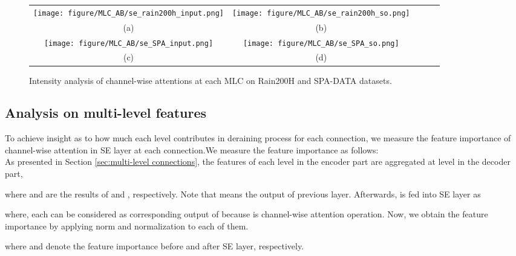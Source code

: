 \documentclass[a4paper,fleqn]{cas-dc}
\begin{document}
\begin{figure*}[!h]\footnotesize
	\centering
	\setlength{\tabcolsep}{0pt}
	
	\begin{tabular}{cclcclccl}
		\multicolumn{3}{c}{\texttt{[image: figure/MLC\_AB/se\_rain200h\_input.png]}} &
		\multicolumn{3}{c}{\texttt{[image: figure/MLC\_AB/se\_rain200h\_so.png]}} \\
		\multicolumn{3}{c}{(a)} &
		\multicolumn{3}{c}{(b)} \\
		\multicolumn{3}{c}{\texttt{[image: figure/MLC\_AB/se\_SPA\_input.png]}} &
		\multicolumn{3}{c}{\texttt{[image: figure/MLC\_AB/se\_SPA\_so.png]}} \\
		\multicolumn{3}{c}{(c)} &
		\multicolumn{3}{c}{(d)}
		
	\end{tabular}
	\caption{ Intensity analysis of channel-wise attentions at each MLC on Rain200H and SPA-DATA datasets.}

	\label{fig:se_analysis}
\end{figure*}


\subsection{Analysis on multi-level features}

To achieve insight as to how much each level contributes in deraining process for each  connection, we measure the feature importance of channel-wise attention in SE layer at each connection.We measure the feature importance as follows: \\
As presented in Section \ref{sec:multi-level connections}, the features of each level in the encoder part are aggregated at level  in the decoder part, 
 
where  and  are the results of  and , respectively. Note that  means the output of previous layer. Afterwards,  is fed into SE layer  as


 
where, each  can be considered as corresponding output of  because  is channel-wise attention operation. Now, we obtain the feature importance by applying  norm and normalization to each of them. 

where  and  denote the feature importance before and after SE layer, respectively. 
\end{document}
